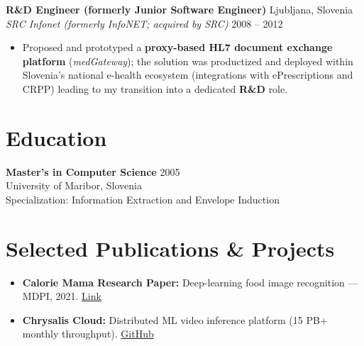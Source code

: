 \documentclass[11pt]{article}
\begin{document}
\textbf{R\&D Engineer (formerly Junior Software Engineer)} \hfill Ljubljana, Slovenia\\
\textit{SRC Infonet (formerly InfoNET; acquired by SRC)} \hfill 2008 -- 2012
\begin{itemize}
  \item Proposed and prototyped a \textbf{proxy-based HL7 document exchange platform} (\textit{medGateway}); the solution was productized and deployed within Slovenia’s national e-health ecosystem (integrations with ePrescriptions and CRPP) leading to my transition into a dedicated \textbf{R\&D} role.
\end{itemize}

\section*{Education}
\textbf{Master's in Computer Science} \hfill 2005\\
University of Maribor, Slovenia\\
Specialization: Information Extraction and Envelope Induction

\section*{Selected Publications \& Projects}
\begin{itemize}
    \item \textbf{Calorie Mama Research Paper:} Deep-learning food image recognition — MDPI, 2021. 
    \href{https://www.mdpi.com/2072-6643/13/11/4132?type=check_update&version=2}{Link}
    \item \textbf{Chrysalis Cloud:} Distributed ML video inference platform (15 PB+ monthly throughput). 
    \href{https://github.com/igorrendulic/video-edge-ai-proxy}{GitHub}
\end{itemize}
\end{document}
